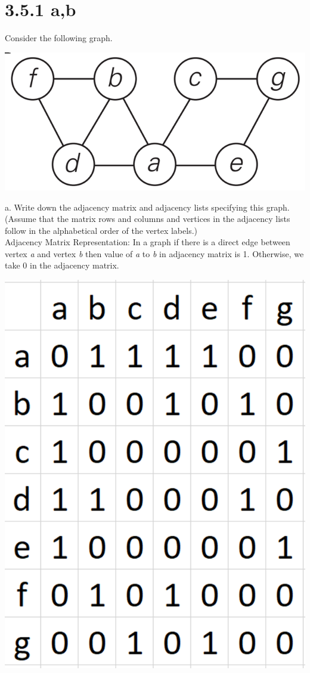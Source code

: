 \documentclass{article}
\begin{document}
\section{3.5.1 a,b}
Consider the following graph.
\begin{center}
\includegraphics[scale = 0.5]{graph.png} \\
\end{center}
a. Write down the adjacency matrix and adjacency lists specifying this graph.
(Assume that the matrix rows and columns and vertices in the adjacency
lists follow in the alphabetical order of the vertex labels.) \\
\indent Adjacency Matrix Representation: In a graph if there is a direct edge between vertex \textit{a} and vertex \textit{b} then value of \textit{a} to \textit{b} in adjacency matrix is 1. Otherwise, we take 0 in the adjacency matrix.
\begin{center}
\includegraphics[scale = 0.3]{adjacency matrix.png} \\
\end{center} 
\end{document}
